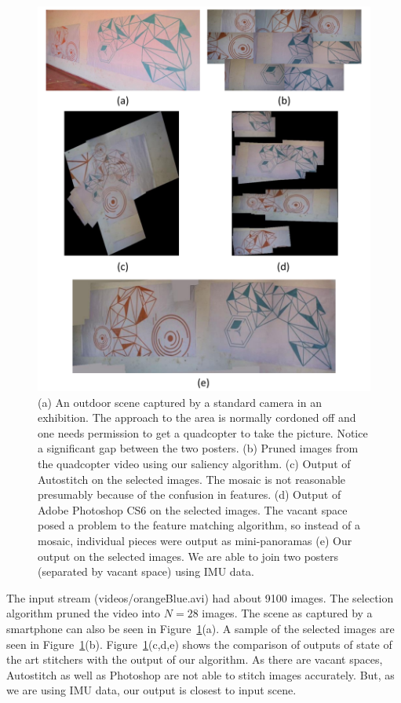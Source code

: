 \documentclass[10pt,twocolumn,letterpaper]{article}
\begin{document}
\begin{figure}[h!]
\centering
\includegraphics[width=0.85\linewidth]{figures/orange_blue.pdf}
\caption{(a) An outdoor scene captured by a standard camera in an
  exhibition. The approach to the area is normally cordoned off and one
  needs permission to get a quadcopter to take the picture.  Notice a
  significant gap between the two posters.  (b) Pruned images from the
  quadcopter video using our saliency algorithm. (c) Output of
  Autostitch on the selected images. The mosaic is not reasonable
  presumably because of the confusion in features. (d) Output of Adobe
  Photoshop CS6 on the selected images. The vacant space posed a
  problem to the feature matching algorithm, so instead of a mosaic,
  individual pieces were output as mini-panoramas (e) Our output on
  the selected images. We are able to join two posters (separated by
  vacant space) using IMU data.}
\label{fig:results1}
\end{figure}

The input stream (videos/orangeBlue.avi) had about 9100 images. The selection
algorithm pruned the video into $N=28$ images. The scene as captured by a smartphone can also be seen in
Figure~\ref{fig:results1}(a). A sample of the
selected images are seen in Figure~\ref{fig:results1}(b).
Figure~\ref{fig:results1}(c,d,e) shows the comparison of outputs of state
of the art stitchers with the output of our algorithm. As there are vacant
spaces, Autostitch as well as Photoshop are not able to stitch images
accurately. But, as we are using IMU data, our output is closest to input scene. 
\end{document}
